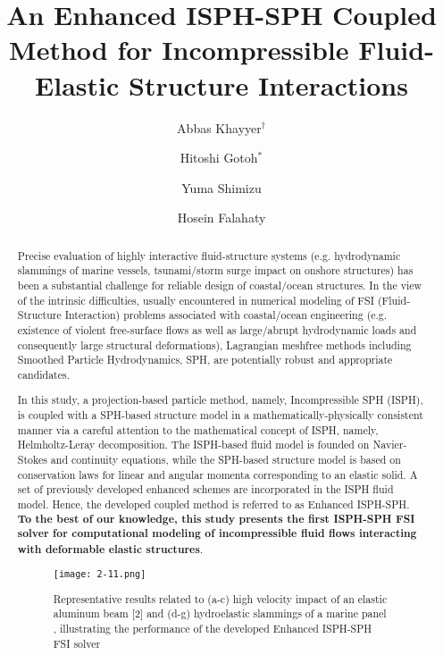 \documentclass[10pt]{article}
\title{An Enhanced ISPH-SPH Coupled Method for Incompressible Fluid-Elastic Structure Interactions}
\date{}
\author{Abbas Khayyer$^\dagger$}
\author{Hitoshi Gotoh$^*$}
\author{Yuma Shimizu}
\author{Hosein Falahaty}
\affil[]{Department of Civil and Earth Resources Engineering, Kyoto University, Kyoto, Japan}
\affil[]{\email{\dagger}{khayyer@particle.kuciv.kyoto-u.ac.jp}, \email{*}{gotoh@particle.kuciv.kyoto-u.ac.jp}}
\begin{document}
\maketitle

\begin{abstract}
Precise evaluation of highly interactive fluid-structure systems (e.g. hydrodynamic slammings of marine vessels, tsunami/storm surge impact on onshore structures) has been a substantial challenge for reliable design of coastal/ocean structures. In the view of the intrinsic difficulties, usually encountered in numerical modeling of FSI (Fluid-Structure Interaction) problems associated with coastal/ocean engineering (e.g. existence of violent free-surface flows as well as large/abrupt hydrodynamic loads and consequently large structural deformations), Lagrangian meshfree methods including Smoothed Particle Hydrodynamics, SPH, are potentially robust and appropriate candidates.

In this study, a projection-based particle method, namely, Incompressible SPH (ISPH), is coupled with a SPH-based structure model in a mathematically-physically consistent manner via a careful attention to the mathematical concept of ISPH, namely, Helmholtz-Leray decomposition. The ISPH-based fluid model is founded on Navier-Stokes and continuity equations, while the SPH-based structure model is based on conservation laws for linear and angular momenta corresponding to an elastic solid. A set of previously developed enhanced schemes \cite{khayyer2017enhancement} are incorporated in the ISPH fluid model. Hence, the developed coupled method is referred to as Enhanced ISPH-SPH. \textbf{To the best of our knowledge, this study presents the first ISPH-SPH FSI solver for computational modeling of incompressible fluid flows interacting with deformable elastic structures}.

\begin{figure}[!htb]
\centering
\texttt{[image: 2-11.png]}
\caption{Representative results related to (a-c) high velocity impact of an elastic aluminum beam [2] and (d-g) hydroelastic slammings of a marine
panel \cite{allen2013mechanics,stenius2013experimental}, illustrating the performance of the developed Enhanced ISPH-SPH FSI solver}\label{fig:2}
\end{figure}


\end{abstract}
\end{document}
